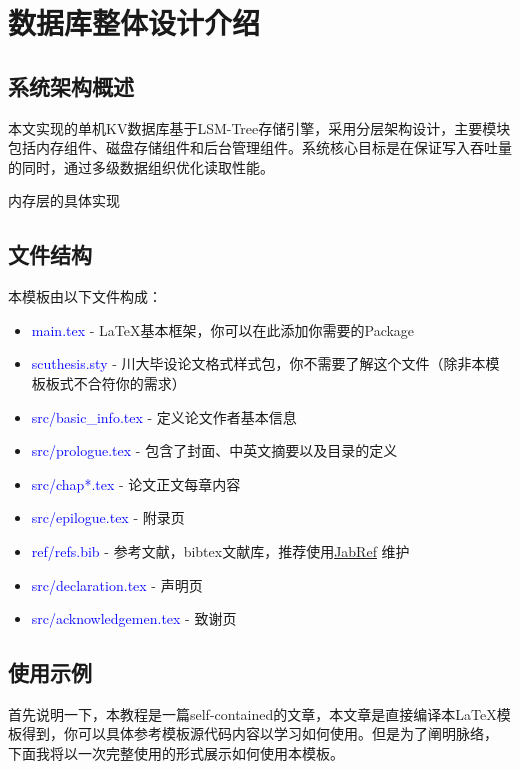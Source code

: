 	\chapter{数据库整体设计介绍}
	
	
	\section{系统架构概述}
	本文实现的单机KV数据库基于LSM-Tree存储引擎，采用分层架构设计，主要模块包括内存组件、磁盘存储组件和后台管理组件。系统核心目标是在保证写入吞吐量的同时，通过多级数据组织优化读取性能。

        内存层的具体实现


	\section{文件结构}
	本模板由以下文件构成：
	\begin{itemize}
	\item \textcolor{blue}{main.tex} - \LaTeX 基本框架，你可以在此添加你需要的Package
	\item \textcolor{blue}{scuthesis.sty} - 川大毕设论文格式样式包，你不需要了解这个文件（除非本模板板式不合符你的需求）
	\item \textcolor{blue}{src/basic\_info.tex} - 定义论文作者基本信息
	\item \textcolor{blue}{src/prologue.tex} - 包含了封面、中英文摘要以及目录的定义
	\item \textcolor{blue}{src/chap*.tex} - 论文正文每章内容
	\item \textcolor{blue}{src/epilogue.tex} - 附录页
	\item \textcolor{blue}{ref/refs.bib} - 参考文献，bibtex文献库，推荐使用\href{http://jabref.sourceforge.net/}{JabRef} 维护
	\item \textcolor{blue}{src/declaration.tex} - 声明页
	\item \textcolor{blue}{src/acknowledgemen.tex} - 致谢页
	 
	\end{itemize}


	\section{使用示例}
	首先说明一下，本教程是一篇self-contained的文章，本文章是直接编译本\LaTeX 模板得到，你可以具体参考模板源代码内容以学习如何使用。但是为了阐明脉络， 下面我将以一次完整使用的形式展示如何使用本模板。
	
